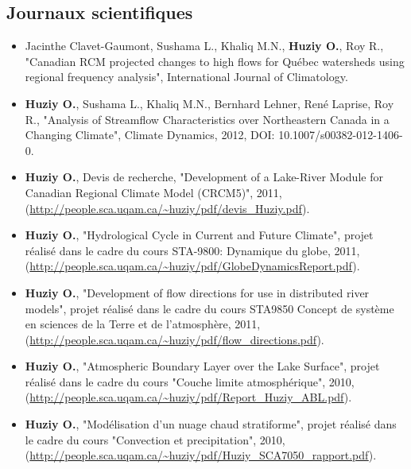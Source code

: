 \documentclass[12pt,a4paper,sans]{moderncv} %
\begin{document}
\subsection{Journaux scientifiques}
\vspace{0.5cm}
\begin{itemize}
  
    \item Jacinthe Clavet-Gaumont, Sushama L., Khaliq M.N.,
    \textbf{Huziy O.}, Roy R., "Canadian RCM projected changes to high
    flows for Québec watersheds using regional frequency analysis", International Journal of Climatology.
    
    \item \textbf{Huziy O.}, Sushama L., Khaliq M.N., Bernhard
    Lehner, René Laprise, Roy R., "Analysis of Streamflow Characteristics over Northeastern Canada 
     in a Changing Climate", Climate Dynamics, 2012, DOI:
     10.1007/s00382-012-1406-0.

   
    \item \textbf{Huziy O.}, Devis de recherche, "Development of a
    Lake-River Module for Canadian Regional Climate Model (CRCM5)", 2011,
    (\url{http://people.sca.uqam.ca/~huziy/pdf/devis_Huziy.pdf}).
   
    \item \textbf{Huziy O.}, "Hydrological Cycle in Current and Future Climate",
    projet réalisé dans le cadre du cours STA-9800: Dynamique du globe, 2011,\\
     (\url{http://people.sca.uqam.ca/~huziy/pdf/GlobeDynamicsReport.pdf}).
   
    \item \textbf{Huziy O.}, "Development of flow directions for use in
    distributed river models", projet réalisé dans le cadre du cours STA9850
    Concept de système en sciences de la Terre et de l'atmosphère, 2011,
    (\url{http://people.sca.uqam.ca/~huziy/pdf/flow_directions.pdf}).
   
    \item \textbf{Huziy O.}, "Atmospheric Boundary Layer over the Lake Surface",
           projet réalisé dans le cadre du cours "Couche limite atmosphérique",
           2010, (\url{http://people.sca.uqam.ca/~huziy/pdf/Report_Huziy_ABL.pdf}).
   
    \item \textbf{Huziy O.}, "Modélisation d’un nuage chaud stratiforme",
       projet réalisé dans le cadre du cours "Convection et precipitation", 2010,
       (\url{http://people.sca.uqam.ca/~huziy/pdf/Huziy_SCA7050_rapport.pdf}).


\end{itemize}
\end{document}

